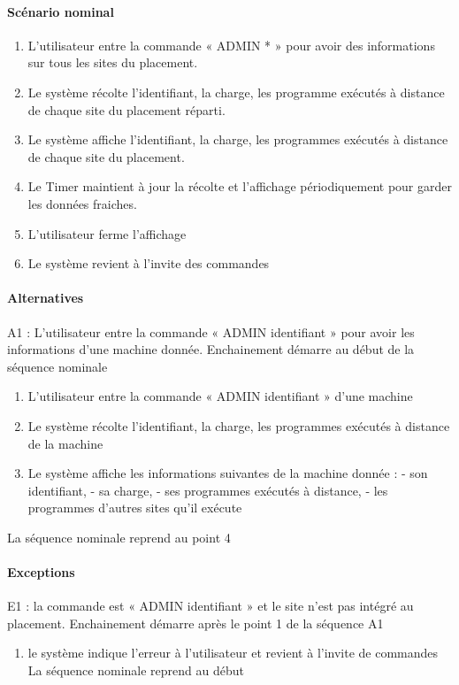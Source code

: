     \paragraph{Scénario nominal}
        \begin{enumerate}
          \item L'utilisateur entre la commande « ADMIN * » pour avoir des informations sur tous les sites
             du placement.
          \item Le système récolte l'identifiant, la charge, les programme exécutés à distance de chaque site
             du placement réparti.
          \item Le système affiche l'identifiant, la charge, les programmes exécutés à distance de chaque site
             du placement.
          \item Le Timer maintient à jour la récolte et l'affichage périodiquement pour garder les données
             fraiches.
          \item L'utilisateur ferme l'affichage
          \item Le système revient à l'invite des commandes
        \end{enumerate}
    \paragraph{Alternatives}
    A1 : L'utilisateur entre la commande « ADMIN identifiant » pour avoir les informations d'une
    machine donnée.
         Enchainement démarre au début de la séquence nominale
         \begin{enumerate}
           \item L'utilisateur entre la commande « ADMIN identifiant » d'une machine
           \item Le système récolte l'identifiant, la charge, les programmes exécutés à distance de la machine
           \item Le système affiche les informations suivantes de la machine donnée :
               - son identifiant,
               - sa charge,
               - ses programmes exécutés à distance,
               - les programmes d'autres sites qu'il exécute
          \end{enumerate}
         La séquence nominale reprend au point 4
    \paragraph{Exceptions}
     E1 : la commande est « ADMIN identifiant » et le site n'est pas intégré au placement.
          Enchainement démarre après le point 1 de la séquence A1
          \begin{enumerate}
          \item le système indique l’erreur à l'utilisateur et revient à l'invite de commandes
          La séquence nominale reprend au début
          \end{enumerate}

